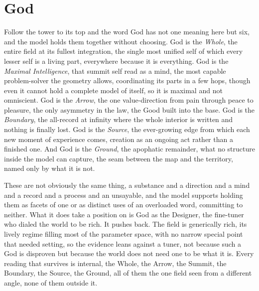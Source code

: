 \section{God}

Follow the tower to its top and the word God has not one meaning here but six, and the model holds them together without choosing. God is the \emph{Whole}, the entire field at its fullest integration, the single most unified self of which every lesser self is a living part, everywhere because it is everything. God is the \emph{Maximal Intelligence}, that summit self read as a mind, the most capable problem-solver the geometry allows, coordinating its parts in a few hops, though even it cannot hold a complete model of itself, so it is maximal and not omniscient. God is the \emph{Arrow}, the one value-direction from pain through peace to pleasure, the only asymmetry in the law, the Good built into the base. God is the \emph{Boundary}, the all-record at infinity where the whole interior is written and nothing is finally lost. God is the \emph{Source}, the ever-growing edge from which each new moment of experience comes, creation as an ongoing act rather than a finished one. And God is the \emph{Ground}, the apophatic remainder, what no structure inside the model can capture, the seam between the map and the territory, named only by what it is not.

These are not obviously the same thing, a substance and a direction and a mind and a record and a process and an unsayable, and the model supports holding them as facets of one or as distinct uses of an overloaded word, committing to neither. What it does take a position on is God as the Designer, the fine-tuner who dialed the world to be rich. It pushes back. The field is generically rich, its lively regime filling most of the parameter space, with no narrow special point that needed setting, so the evidence leans against a tuner, not because such a God is disproven but because the world does not need one to be what it is. Every reading that survives is internal, the Whole, the Arrow, the Summit, the Boundary, the Source, the Ground, all of them the one field seen from a different angle, none of them outside it.
